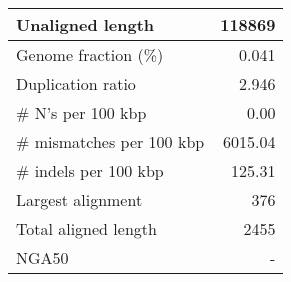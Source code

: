 \documentclass[12pt,a4paper]{article}
\begin{document}
\begin{table}[ht]
\begin{center}
\begin{tabular}{|l*{1}{|r}|}
Unaligned length & 118869 \\ \hline
Genome fraction (\%) & 0.041 \\ \hline
Duplication ratio & 2.946 \\ \hline
\# N's per 100 kbp & 0.00 \\ \hline
\# mismatches per 100 kbp & 6015.04 \\ \hline
\# indels per 100 kbp & 125.31 \\ \hline
Largest alignment & 376 \\ \hline
Total aligned length & 2455 \\ \hline
NGA50 & - \\ \hline
\end{tabular}
\end{center}
\end{table}
\end{document}
